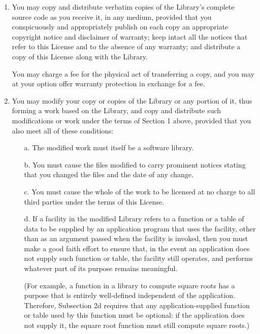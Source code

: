 \begin{enumerate}
\item You may copy and distribute verbatim copies of the Library's
complete source code as you receive it, in any medium, provided that
you conspicuously and appropriately publish on each copy an
appropriate copyright notice and disclaimer of warranty; keep intact
all the notices that refer to this License and to the absence of any
warranty; and distribute a copy of this License along with the
Library.

  You may charge a fee for the physical act of transferring a copy,
and you may at your option offer warranty protection in exchange for a
fee.

\item You may modify your copy or copies of the Library or any portion
of it, thus forming a work based on the Library, and copy and
distribute such modifications or work under the terms of Section 1
above, provided that you also meet all of these conditions:

\begin{enumerate}
\item[a.]
The modified work must itself be a software library.

\item[b.]
You must cause the files modified to carry prominent notices
stating that you changed the files and the date of any change.

\item[c.]
You must cause the whole of the work to be licensed at no
charge to all third parties under the terms of this License.

\item[d.]
  If a facility in the modified Library refers to a function or a
  table of data to be supplied by an application program that uses the
  facility, other than as an argument passed when the facility is
  invoked, then you must make a good faith effort to ensure that, in
  the event an application does not supply such function or table, the
  facility still operates, and performs whatever part of its purpose
  remains meaningful.

    (For example, a function in a library to compute square roots has
    a purpose that is entirely well-defined independent of the
    application.  Therefore, Subsection 2d requires that any
    application-supplied function or table used by this function must
    be optional: if the application does not supply it, the square
    root function must still compute square roots.)
\end{enumerate}


\end{enumerate}
